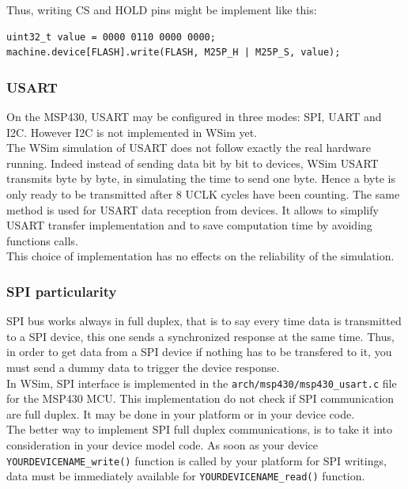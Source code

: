 \documentclass[a4paper,10pt]{report}
\begin{document}
\medskip
Thus, writing CS and HOLD pins might be implement like this:
\begin{verbatim}
uint32_t value = 0000 0110 0000 0000;
machine.device[FLASH].write(FLASH, M25P_H | M25P_S, value);
\end{verbatim}

\subsubsection{USART}
On the MSP430, USART may be configured in three modes: SPI, UART and I2C. However I2C is not implemented in WSim yet.\\

The WSim simulation of USART does not follow exactly the real hardware running. Indeed instead of sending data bit by bit to devices, WSim USART transmits byte by byte, in simulating the time to send one byte. Hence a byte is only ready to be transmitted after 8 UCLK cycles have been counting. The same method is used for USART data reception from devices.
It allows to simplify USART transfer implementation and to save computation time by avoiding functions calls.\\

This choice of implementation has no effects on the reliability of the simulation.


\subsubsection{SPI particularity}
SPI bus works always in full duplex, that is to say every time data is transmitted to a SPI device, this one sends a synchronized response at the same time. Thus, in order to get data from a SPI device if nothing has to be transfered to it, you must send a dummy data to trigger the device response.\\

In WSim, SPI interface is implemented in the \verb$arch/msp430/msp430_usart.c$ file for the MSP430 MCU. This implementation do not check if SPI communication are full duplex. It may be done in your platform or in your device code.\\

The better way to implement SPI full duplex communications, is to take it into consideration in your device model code. As soon as your device \verb$YOURDEVICENAME_write()$ function is called by your platform for SPI writings, data must be immediately available for \verb$YOURDEVICENAME_read()$ function.
\end{document}
